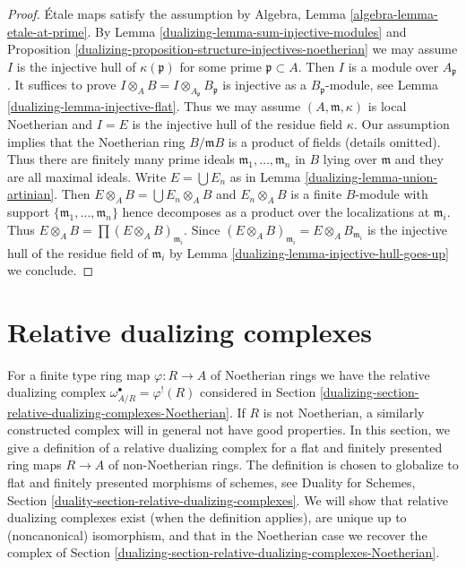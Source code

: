 \begin{proof}

\'Etale maps satisfy the assumption by
Algebra, Lemma \ref{algebra-lemma-etale-at-prime}.
By Lemma \ref{dualizing-lemma-sum-injective-modules} and
Proposition \ref{dualizing-proposition-structure-injectives-noetherian}
we may assume $I$ is the injective hull of $\kappa(\mathfrak p)$
for some prime $\mathfrak p \subset A$.
Then $I$ is a module over $A_\mathfrak p$.
It suffices to prove $I \otimes_A B = I \otimes_{A_\mathfrak p} B_\mathfrak p$
is injective as a $B_\mathfrak p$-module, see
Lemma \ref{dualizing-lemma-injective-flat}.
Thus we may assume $(A, \mathfrak m, \kappa)$ is local Noetherian
and $I = E$ is the injective hull of the residue field $\kappa$.
Our assumption implies that the Noetherian ring $B/\mathfrak m B$
is a product of fields (details omitted).
Thus there are finitely many prime ideals
$\mathfrak m_1, \ldots, \mathfrak m_n$ in $B$
lying over $\mathfrak m$ and they are all maximal ideals.
Write $E = \bigcup E_n$ as in Lemma \ref{dualizing-lemma-union-artinian}.
Then $E \otimes_A B = \bigcup E_n \otimes_A B$
and $E_n \otimes_A B$ is a finite $B$-module with support
$\{\mathfrak m_1, \ldots, \mathfrak m_n\}$ hence decomposes
as a product over the localizations at $\mathfrak m_i$.
Thus $E \otimes_A B = \prod (E \otimes_A B)_{\mathfrak m_i}$.
Since $(E \otimes_A B)_{\mathfrak m_i} = E \otimes_A B_{\mathfrak m_i}$
is the injective hull of the residue field of $\mathfrak m_i$
by Lemma \ref{dualizing-lemma-injective-hull-goes-up} we conclude.
\end{proof}

\section{Relative dualizing complexes}
\label{dualizing-section-relative-dualizing-complexes}
For a finite type ring map $\varphi : R \to A$ of Noetherian rings
we have the relative dualizing complex $\omega_{A/R}^\bullet = \varphi^!(R)$
considered in Section \ref{dualizing-section-relative-dualizing-complexes-Noetherian}.
If $R$ is not Noetherian, a similarly constructed complex will
in general not have good properties. In this section, we give a
definition of a relative dualizing complex for a flat and finitely presented
ring maps $R \to A$ of non-Noetherian rings. The definition is
chosen to globalize to flat and finitely presented morphisms
of schemes, see Duality for Schemes, Section
\ref{duality-section-relative-dualizing-complexes}. We will
show that relative dualizing complexes exist (when the definition
applies), are unique up to (noncanonical) isomorphism,
and that in the Noetherian case we recover the complex of
Section \ref{dualizing-section-relative-dualizing-complexes-Noetherian}.

